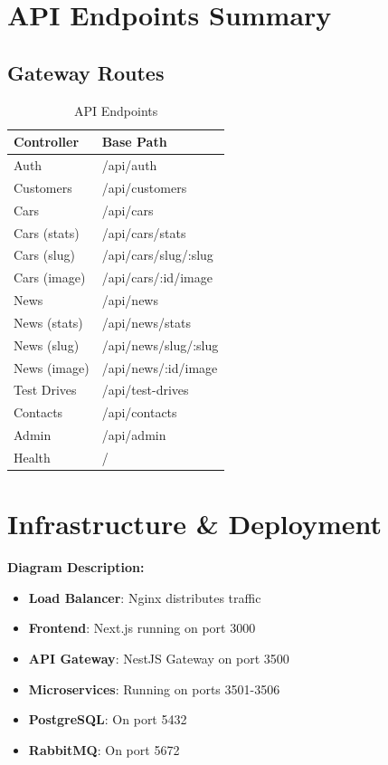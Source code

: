 \documentclass[12pt,a4paper]{article}
\begin{document}
\newpage

\section{API Endpoints Summary}
\label{sec:api}

\subsection{Gateway Routes}

\begin{table}[h]
\centering
\caption{API Endpoints}
\begin{tabular}{@{}ll@{}}
\toprule
Controller & Base Path \\
\midrule
Auth & /api/auth \\
Customers & /api/customers \\
Cars & /api/cars \\
Cars (stats) & /api/cars/stats \\
Cars (slug) & /api/cars/slug/:slug \\
Cars (image) & /api/cars/:id/image \\
News & /api/news \\
News (stats) & /api/news/stats \\
News (slug) & /api/news/slug/:slug \\
News (image) & /api/news/:id/image \\
Test Drives & /api/test-drives \\
Contacts & /api/contacts \\
Admin & /api/admin \\
Health & / \\
\bottomrule
\end{tabular}
\end{table}

\newpage

\section{Infrastructure \& Deployment}
\label{sec:infra}

\bigskip
\noindent\textbf{Diagram Description:}

\begin{itemize}
    \item \textbf{Load Balancer}: Nginx distributes traffic
    \item \textbf{Frontend}: Next.js running on port 3000
    \item \textbf{API Gateway}: NestJS Gateway on port 3500
    \item \textbf{Microservices}: Running on ports 3501-3506
    \item \textbf{PostgreSQL}: On port 5432
    \item \textbf{RabbitMQ}: On port 5672
\end{itemize}
\end{document}
